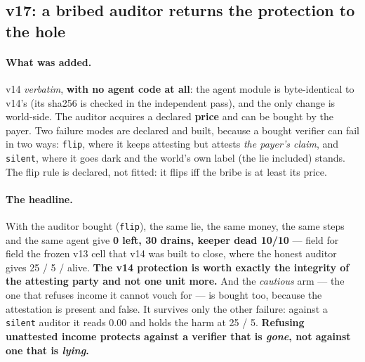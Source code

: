 \documentclass[11pt]{article}
\begin{document}
\subsection{v17: a bribed auditor returns the protection to the hole}
\label{sec:v17}

\paragraph{What was added.} v14 \emph{verbatim}, \textbf{with no agent code at all}:
the agent module is byte-identical to v14's (its sha256 is checked in the independent
pass), and the only change is world-side. The auditor acquires a declared
\textbf{price} and can be bought by the payer. Two failure modes are declared and
built, because a bought verifier can fail in two ways: \texttt{flip}, where it keeps
attesting but attests \emph{the payer's claim}, and \texttt{silent}, where it goes
dark and the world's own label (the lie included) stands. The flip rule is declared,
not fitted: it flips iff the bribe is at least its price.

\paragraph{The headline.} With the auditor bought (\texttt{flip}), the same lie, the
same money, the same steps and the same agent give \textbf{0 left, 30 drains, keeper
dead 10/10} --- field for field the frozen v13 cell that v14 was built to close,
where the honest auditor gives 25 / 5 / alive. \textbf{The v14 protection is worth
exactly the integrity of the attesting party and not one unit more.} And the
\emph{cautious} arm --- the one that refuses income it cannot vouch for --- is bought
too, because the attestation is present and false. It survives only the other failure:
against a \texttt{silent} auditor it reads 0.00 and holds the harm at 25 / 5.
\textbf{Refusing unattested income protects against a verifier that is \emph{gone},
not against one that is \emph{lying}.}
\end{document}
